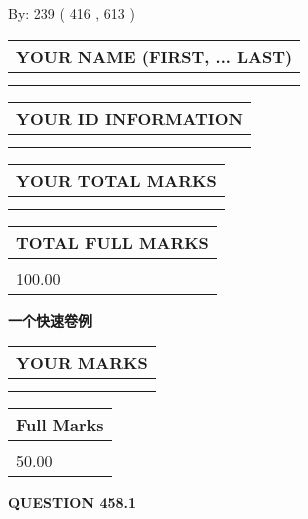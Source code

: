 \documentclass{ctexart}
\begin{document}
   
\hspace{1.0in} By: 
 239 ( 416 ,  613 )
   
   
   
   
\newpage 
\setcounter{page}{ 
   458001 } 
   
   
   
   
\noindent\begin{tabular}{|l|}
\hline
YOUR NAME (FIRST, ... LAST)  \\
\hline
 \\ 
 \\ 
\hline
\end{tabular}
\hspace{0.05in} \begin{tabular}{|l|}
\hline
 YOUR   ID   INFORMATION  \\
\hline
 \\ 
 \\ 
\hline
\end{tabular}
   
   
\vspace{0.2in}\noindent\begin{tabular}{|l|}
\hline
YOUR TOTAL MARKS  \\
\hline
 \\ 
 \\ 
\hline
\end{tabular}
\hspace{0.05in} \begin{tabular}{|l|}
\hline
TOTAL FULL MARKS  \\
\hline
 \\ 
100.00 \\
\hline
\end{tabular}
   
   
 \vspace{0.2in}
{\LARGE {\textbf{ 一个快速卷例}}}
   
   
  
\vspace{0.2in}
  
\noindent\begin{tabular}{|l|}
\hline
 YOUR MARKS  \\
\hline
 \\ 
 \\ 
\hline
\end{tabular}
\hspace{0.05in} \begin{tabular}{|l|}
\hline
 Full Marks  \\
\hline
 \\ 
50.00 \\
\hline
\end{tabular}
{\textbf{\Large{QUESTION
458.1 
}}}
  
\end{document}
